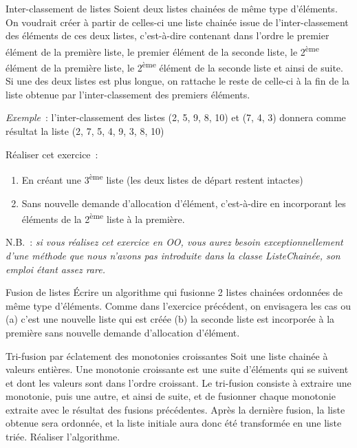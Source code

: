 	\begin{Exercice}{Inter-classement de listes}
		Soient deux listes chainées de même type d'éléments. On voudrait 
		créer à partir de celles-ci une liste chainée issue de
		l'inter-classement des éléments de ces deux listes, c'est-à-dire 
		contenant dans l'ordre le premier élément de la
		première liste, le premier élément de la seconde liste, 
		le 2\textsuperscript{ème} élément de la première liste, le
		2\textsuperscript{ème} élément de la seconde liste et ainsi de suite. 
		Si une des deux listes est plus longue, on
		rattache le reste de celle-ci à la fin de la liste obtenue par 
		l'inter-classement des premiers éléments.

		\textit{Exemple}~: l'inter-classement des listes (2, 5, 9, 8, 10) et 
		(7, 4, 3) donnera comme résultat la liste
		(2, 7, 5, 4, 9, 3, 8, 10)

		Réaliser cet exercice~:

		\begin{enumerate}
			\item {
				En créant une 3\textsuperscript{ème} liste 
				(les deux listes de départ restent intactes)}
			\item {
				Sans nouvelle demande d'allocation d'élément, c'est-à-dire 
				en incorporant les éléments de la 2\textsuperscript{ème}
				liste à la première.}
		\end{enumerate}
		
		N.B.~: \textit{si vous réalisez cet exercice en OO, vous aurez besoin 
		exceptionnellement d'une méthode } 
		\textit{ que nous n'avons pas introduite dans la classe ListeChainée, 
		son emploi étant assez rare.}
	\end{Exercice}
	
	\begin{Exercice}{Fusion de listes}
		Écrire un algorithme qui fusionne 2 listes chainées ordonnées 
		de même type d'éléments. Comme dans l'exercice précédent,
		on envisagera les cas ou (a) c'est une nouvelle liste qui 
		est créée (b) la seconde liste est incorporée à la première
		sans nouvelle demande d'allocation d'élément.
	\end{Exercice}
	
	\begin{Exercice}{Tri-fusion par éclatement des monotonies croissantes}
		Soit une liste chainée à valeurs entières. Une monotonie croissante 
		est une suite d'éléments qui se suivent et dont les
		valeurs sont dans l'ordre croissant. Le tri-fusion consiste à extraire 
		une monotonie, puis une autre, et ainsi de
		suite, et de fusionner chaque monotonie extraite avec le résultat 
		des fusions précédentes. Après la dernière fusion, la
		liste obtenue sera ordonnée, et la liste initiale aura donc été 
		transformée en une liste triée. Réaliser l'algorithme.
	\end{Exercice}


